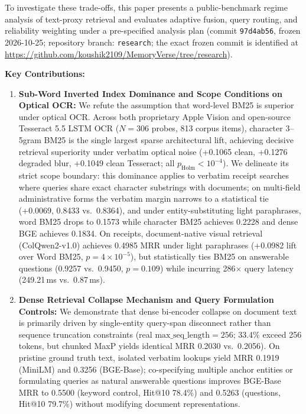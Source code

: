 \documentclass[conference]{IEEEtran}
\begin{document}
To investigate these trade-offs, this paper presents a public-benchmark regime analysis of text-proxy retrieval and evaluates adaptive fusion, query routing, and reliability weighting under a pre-specified analysis plan (commit \texttt{97d4ab56}, frozen 2026-10-25; repository branch: \texttt{research}; the exact frozen commit is identified at \url{https://github.com/koushik2109/MemoryVerse/tree/research}).

\textbf{Key Contributions:}
\begin{enumerate}
    \setlength{\itemsep}{1pt plus 0.5pt}
    \setlength{\parskip}{0pt}
    \item \textbf{Sub-Word Inverted Index Dominance and Scope Conditions on Optical OCR:} We refute the assumption that word-level BM25 is superior under optical OCR. Across both proprietary Apple Vision and open-source Tesseract 5.5 LSTM OCR ($N=306$ probes, 813 corpus items), character 3--5gram BM25 is the single largest sparse architectural lift, achieving decisive retrieval superiority under verbatim optical noise (+0.1065 clean, +0.1276 degraded blur, +0.1049 clean Tesseract; all $p_{\text{Holm}} < 10^{-4}$). We delineate its strict scope boundary: this dominance applies to verbatim receipt searches where queries share exact character substrings with documents; on multi-field administrative forms the verbatim margin narrows to a statistical tie (+0.0069, 0.8433 vs.\ 0.8364), and under entity-substituting light paraphrases, word BM25 drops to 0.1573 while character BM25 achieves 0.2228 and dense BGE achieves 0.1834. On receipts, document-native visual retrieval (ColQwen2-v1.0) achieves 0.4985 MRR under light paraphrases (+0.0982 lift over Word BM25, $p = 4 \times 10^{-5}$), but statistically ties BM25 on answerable questions (0.9257 vs.\ 0.9450, $p = 0.109$) while incurring 286$\times$ query latency (249.21\,ms vs.\ 0.87\,ms).
    \item \textbf{Dense Retrieval Collapse Mechanism and Query Formulation Controls:} We demonstrate that dense bi-encoder collapse on document text is primarily driven by single-entity query-span disconnect rather than sequence truncation constraints (real $\text{max\_seq\_length}=256$; 33.4\% exceed 256 tokens, but chunked MaxP yields identical MRR 0.2030 vs.\ 0.2056). On pristine ground truth text, isolated verbatim lookups yield MRR 0.1919 (MiniLM) and 0.3256 (BGE-Base); co-specifying multiple anchor entities or formulating queries as natural answerable questions improves BGE-Base MRR to 0.5500 (keyword control, Hit@10 78.4\%) and 0.5263 (questions, Hit@10 79.7\%) without modifying document representations.

\end{enumerate}
\end{document}
